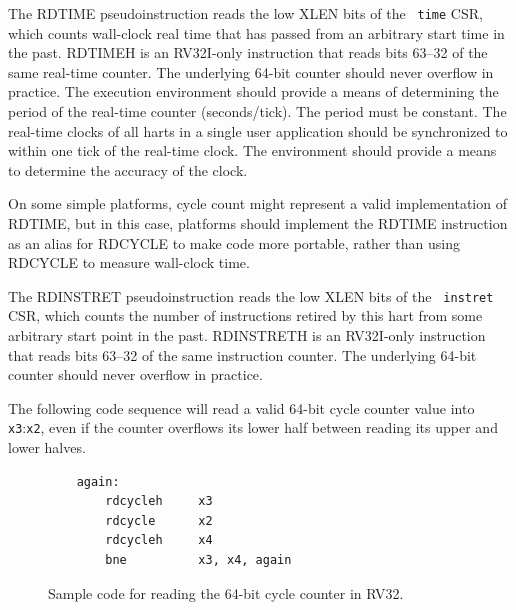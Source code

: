 The RDTIME pseudoinstruction reads the low XLEN bits of the {\tt
  time} CSR, which counts wall-clock real time that has passed from an
arbitrary start time in the past.  RDTIMEH is an RV32I-only instruction
that reads bits 63--32 of the same real-time counter.  The underlying 64-bit
counter should never overflow in practice.  The execution environment
should provide a means of determining the period of the real-time
counter (seconds/tick).  The period must be constant.  The
real-time clocks of all harts in a single user application
should be synchronized to within one tick of the real-time clock.  The
environment should provide a means to determine the accuracy of the
clock.

\begin{commentary}
On some simple platforms, cycle count might represent a valid
implementation of RDTIME, but in this case, platforms should implement
the RDTIME instruction as an alias for RDCYCLE to make code more
portable, rather than using RDCYCLE to measure wall-clock time.
\end{commentary}

The RDINSTRET pseudoinstruction reads the low XLEN bits of the {\tt
  instret} CSR, which counts the number of instructions retired by
this hart from some arbitrary start point in the past.  RDINSTRETH is
an RV32I-only instruction that reads bits 63--32 of the same
instruction counter. The underlying 64-bit counter should never
overflow in practice.

The following code sequence will read a valid 64-bit cycle counter value into
{\tt x3}:{\tt x2}, even if the counter overflows its lower half between reading its upper
and lower halves.

\begin{figure}[h!]
\begin{center}
\begin{verbatim}
    again:
        rdcycleh     x3
        rdcycle      x2
        rdcycleh     x4
        bne          x3, x4, again
\end{verbatim}
\end{center}
\caption{Sample code for reading the 64-bit cycle counter in RV32.}
\label{rdcycle}
\end{figure}

